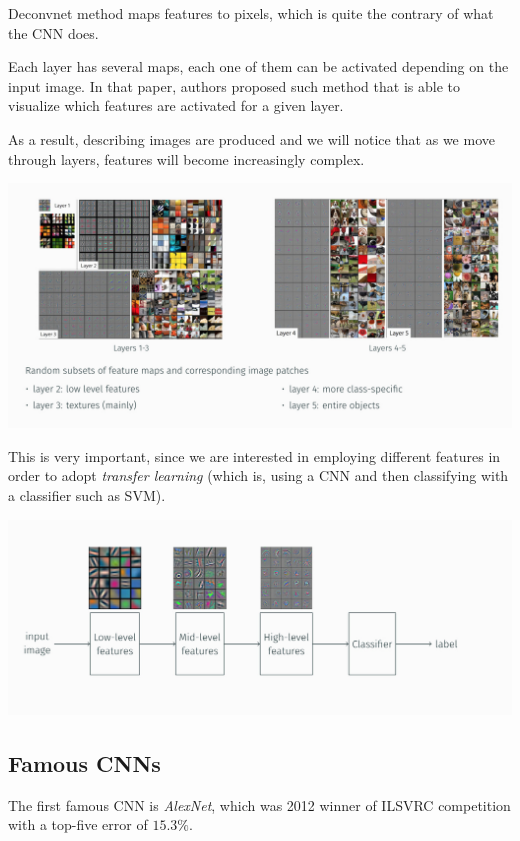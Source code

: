 \documentclass[10pt]{report}
\begin{document}
Deconvnet method maps features to pixels, which is quite the contrary of
what the CNN does.

Each layer has several maps, each one of them can be activated depending
on the input image. In that paper, authors proposed such method that is
able to visualize which features are activated for a given layer.

As a result, describing images are produced and we will notice that as
we move through layers, features will become increasingly complex.

\begin{center}
\includegraphics[width=.9\linewidth]{./pics/cnn/deconvnet-output.jpg}
\end{center}

This is very important, since we are interested in employing different
features in order to adopt \emph{transfer learning} (which is, using a CNN
and then classifying with a classifier such as SVM).

\begin{center}
\includegraphics[width=.9\linewidth]{./pics/cnn/feature-visualization.jpg}
\end{center}

\subsection{Famous CNNs}
\label{todo-famous-cnns}
The first famous CNN is \emph{AlexNet}, which was 2012 winner of ILSVRC
competition with a top-five error of \(15.3\%\).
\end{document}
